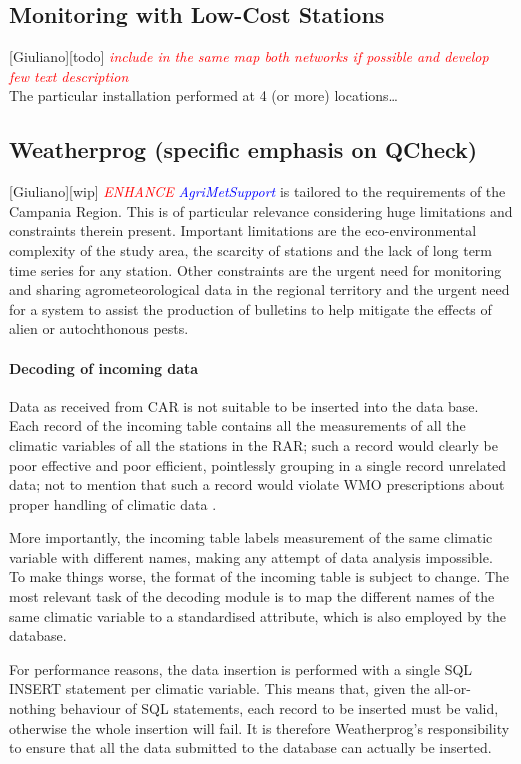 \documentclass[authoryear,preprint,review,12pt]{elsarticle}
\newcommand{\note}[1]{\emph{\textcolor{red}{#1}}}
\newcommand{\update}[1]{\emph{\textcolor{blue}{#1}}}
\newcommand{\gci}{\update{AgriMetSupport}\xspace}
\begin{document}
\subsection{Monitoring with Low-Cost Stations}[Giuliano][todo]
\note{include in the same map both networks if possible and develop few text description}\\
The particular installation performed at 4 (or more) locations\ldots

\subsection{Weatherprog (specific emphasis on QCheck)}[Giuliano][wip] \label{weatherprog:casestudy}
\note{ENHANCE}
\gci is tailored to the requirements of the Campania Region.
This is of particular relevance considering huge limitations and constraints therein present.
Important limitations are the eco-environmental complexity of the study area, the scarcity of stations and the lack of long term time series for any station.
Other constraints are the urgent need for monitoring and sharing agrometeorological data in the regional territory %
and the urgent need for a system to assist the production of bulletins to help mitigate the effects of alien or autochthonous pests.
 
 \paragraph{Decoding of incoming data} Data as received from CAR is not suitable to be inserted into the data base. Each record of the incoming table contains all the measurements of all the climatic variables of all the stations in the RAR; such a record would clearly be poor effective and poor efficient, pointlessly grouping in a single record unrelated data; not to mention that such a record would violate WMO prescriptions about proper handling of climatic data \citep{wcdmp:cdms}.
 
 More importantly, the incoming table labels measurement of the same climatic variable with different names, making any attempt of data analysis impossible. To make things worse, the format of the incoming table is subject to change. The most relevant task of the decoding module is to map the different names of the same climatic variable to a standardised attribute, which is also employed by the database.
 
 For performance reasons, the data insertion is performed with a single SQL INSERT statement per climatic variable. This means that, given the all-or-nothing behaviour of SQL statements, each record to be inserted must be valid, otherwise the whole insertion will fail. It is therefore Weatherprog's responsibility to ensure that all the data submitted to the database can actually be inserted.
 
\end{document}
